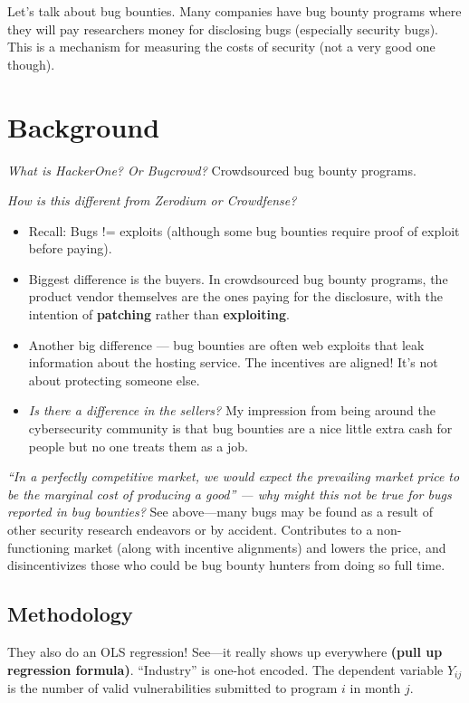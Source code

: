 \documentclass[11pt]{article}
\begin{document}
Let's talk about bug bounties. Many companies have bug bounty programs where they will pay researchers money for disclosing bugs (especially security bugs). This is a mechanism for measuring the costs of security (not a very good one though).


\section{Background}

{\it What is HackerOne? Or Bugcrowd?} Crowdsourced bug bounty programs. 

{\it How is this different from Zerodium or Crowdfense?} 
\begin{itemize}
    \item Recall: Bugs != exploits (although some bug bounties require proof of exploit before paying). 
    \item Biggest difference is the buyers. In crowdsourced bug bounty programs, the product vendor themselves are the ones paying for the disclosure, with the intention of {\bf patching} rather than {\bf exploiting}.
    \item Another big difference --- bug bounties are often web exploits that leak information about the hosting service. The incentives are aligned! It's not about protecting someone else. 
    \item {\it Is there a difference in the sellers?} My impression from being around the cybersecurity community is that bug bounties are a nice little extra cash for people but no one treats them as a job. 
\end{itemize}

{\it ``In a perfectly competitive market, we would expect the prevailing market price to be the marginal cost of producing a good'' --- why might this not be true for bugs reported in bug bounties?} See above---many bugs may be found as a result of other security research endeavors or by accident. Contributes to a non-functioning market (along with incentive alignments) and lowers the price, and disincentivizes those who could be bug bounty hunters from doing so full time. 

\subsection{Methodology}

They also do an OLS regression! See---it really shows up everywhere {\bf (pull up regression formula)}. ``Industry'' is one-hot encoded. The dependent variable $Y_{ij}$ is the number of valid vulnerabilities submitted to program $i$ in month $j$.
\end{document}
